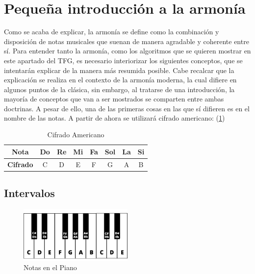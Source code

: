 \section{Pequeña introducción a la armonía}

Como se acaba de explicar, la armonía se define como la combinación y disposición de notas musicales que suenan de manera agradable y coherente entre sí. Para entender tanto la armonía, como los algoritmos que se quieren mostrar en este apartado del TFG, es necesario interiorizar los siguientes conceptos, que se intentarán explicar de la manera más resumida posible. Cabe recalcar que la explicación se realiza en el contexto de la armonía moderna, la cual difiere en algunos puntos de la clásica, sin embargo, al tratarse de una introducción, la mayoría de conceptos que van a ser mostrados se comparten entre ambas doctrinas. A pesar de ello, una de las primeras cosas en las que sí difieren es en el nombre de las notas. A partir de ahora se utilizará cifrado americano: (\ref{tab:cifrado_americano})

\begin{table}[h]
    \centering
    \begin{tabular}{c||c|c|c|c|c|c|c}
        \textbf{Nota} & Do & Re & Mi & Fa & Sol & La & Si \\
        \hline
        \textbf{Cifrado} & C & D & E & F & G & A & B \\
    \end{tabular}
    \caption{Cifrado Americano}
    \label{tab:cifrado_americano}
\end{table}    

\subsection{Intervalos}\label{sec:arm:intervalos}

\begin{figure}[h]
    \centering
    \includegraphics[width = 0.5\textwidth]{Imagenes/Bitmap/piano.png}
    \caption{Notas en el Piano}
    \label{fig:pianoImage}
\end{figure}

